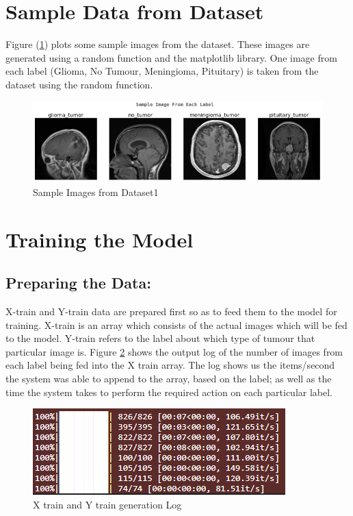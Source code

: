\section{Sample Data from Dataset}
Figure (\ref{fig:data_sample1}) plots some sample images from the dataset. These images are generated using a random function and the matplotlib library. One image from each label (Glioma, No Tumour, Meningioma, Pituitary) is taken from the dataset using the random function.
\begin{figure}[H]
\includegraphics[scale=0.7]{Photos/dataset_sample1.PNG}
\caption{Sample Images from Dataset1} \label{fig:data_sample1}
\end{figure}

\section{Training the Model}
\subsection{Preparing the Data:}
X-train and Y-train data are prepared first so as to feed them to the model for training. X-train is an array which consists of the actual images which will be fed to the model. Y-train refers to the label about which type of tumour that particular image is. Figure \ref{fig:train_log} shows the output log of the number of images from each label being fed into the X train array. The log shows us the items/second the system was able to append to the array, based on the label; as well as the time the system takes to perform the required action on each particular label.
\begin{figure}[H]
\includegraphics[scale=1]{Photos/train_log.PNG}
\caption{X train and Y train generation Log} \label{fig:train_log}
\end{figure}

